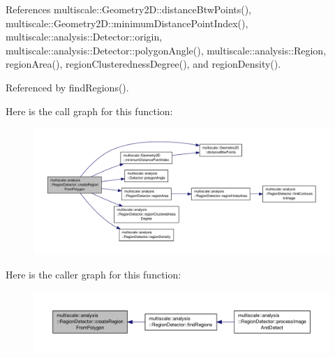 References multiscale\-::\-Geometry2\-D\-::distance\-Btw\-Points(), multiscale\-::\-Geometry2\-D\-::minimum\-Distance\-Point\-Index(), multiscale\-::analysis\-::\-Detector\-::origin, multiscale\-::analysis\-::\-Detector\-::polygon\-Angle(), multiscale\-::analysis\-::\-Region, region\-Area(), region\-Clusteredness\-Degree(), and region\-Density().



Referenced by find\-Regions().



Here is the call graph for this function\-:
\nopagebreak
\begin{figure}[H]
\begin{center}
\leavevmode
\includegraphics[width=350pt]{classmultiscale_1_1analysis_1_1RegionDetector_a1416b365f921e02e5161d72b0b69f287_cgraph}
\end{center}
\end{figure}




Here is the caller graph for this function\-:
\nopagebreak
\begin{figure}[H]
\begin{center}
\leavevmode
\includegraphics[width=350pt]{classmultiscale_1_1analysis_1_1RegionDetector_a1416b365f921e02e5161d72b0b69f287_icgraph}
\end{center}
\end{figure}


